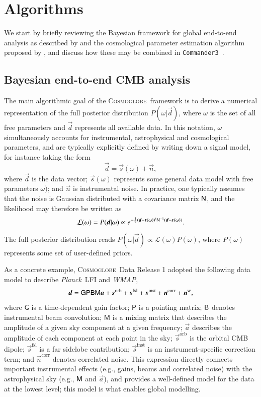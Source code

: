\documentclass[twocolumn]{../common/aa}
\def\WMAP{\emph{WMAP}}
\def\Planck{\emph{Planck}}
\def\commanderthree{\texttt{Commander3}}
\renewcommand{\d}[0]{\vec{d}}
\newcommand{\B}[0]{\tens{B}}
\renewcommand{\G}[0]{\tens{G}}
\newcommand{\n}[0]{\vec{n}}
\newcommand{\s}[0]{\vec{s}}
\renewcommand{\a}[0]{\vec{a}}
\newcommand{\N}[0]{\tens{N}}
\newcommand{\M}[0]{\tens{M}}
\renewcommand{\P}[0]{\tens{P}}
\newcommand{\cosmoglobe}{\textsc{Cosmoglobe}}
\begin{document}
\section{Algorithms}
\label{sec:methods}

We start by briefly reviewing the Bayesian framework for global end-to-end analysis as described by \citet{bp01,watts2023_dr1} and the cosmological parameter estimation algorithm proposed by \citet{racine:2016}, and discuss how these may be combined in \commanderthree\ \citep{bp03}.

\subsection{Bayesian end-to-end CMB analysis}

The main algorithmic goal of the \cosmoglobe\ framework is to derive a numerical representation of the full posterior distribution $P(\omega|\d)$, where $\omega$ is the set of all free parameters and $\d$ represents all available data. In this notation, $\omega$ simultaneously accounts for instrumental, astrophysical and cosmological parameters, and are typically explicitly defined by writing down a signal model, for instance taking the form
\begin{equation}
    \label{eq:data_model}
    \d = \s(\omega) + \n,
\end{equation}
where $\d$ is the data vector; $\s(\omega)$ represents some general data model with free parameters $\omega)$; and $\n$ is instrumental noise. In practice, one typically assumes that the noise is Gaussian distributed with a covariance matrix $\N$, and the likelihood may therefore be written as
\begin{equation}
  \mathcal{L}(\omega) = P(\d|\omega) \propto e^{-\frac{1}{2}\left(\d-\s(\omega)\right)^t\N^{-1}\left(\d-\s(\omega)\right)}.
\end{equation}
The full posterior distribution reads $P(\omega|\d) \propto \mathcal{L}(\omega)P(\omega)$, where $P(\omega)$ represents some set of user-defined priors.

As a concrete example, \cosmoglobe\ Data Release 1 \citep{watts2023_dr1} adopted the following data model to describe \Planck\ LFI and \WMAP,
\begin{equation}
	\label{eq:model}
	\d =\G\P\B\M\a+ \s^\mathrm{orb}
	+\s^\mathrm{fsl} + \s^\mathrm{inst}+ \n^\mathrm{corr}+\n^\mathrm w,
\end{equation}
where $\mathsf G$ is a time-dependent gain factor; $\mathsf P$ is a pointing matrix;
$\B$ denotes instrumental beam convolution; $\mathsf M$ is a mixing matrix that describes the amplitude of a given sky component at a given frequency; $\a$ describes the amplitude of each component at each point in the sky; $\s^\mathrm{orb}$ is the orbital CMB dipole; $\s^\mathrm{fsl}$ is a far sidelobe contribution; $\s^\mathrm{inst}$ is an instrument-specific correction term; and $\n^\mathrm{corr}$ denotes correlated noise. This expression directly connects important instrumental effects (e.g., gains, beams and correlated noise) with the astrophysical sky (e.g., $\M$ and $\a$), and provides a well-defined model for the data at the lowest level; this model is what enables global modelling.
\end{document}
